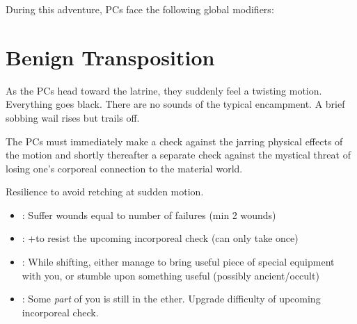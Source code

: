 \documentclass{book}
\newcommand{\spa}{\hskip 0.3em }
\newcommand{\df}{\DifficultyDie }
\newcommand{\stb}{\SetbackDie }
\newcommand{\ch}{\ChallengeDie }
\newcommand{\bbb}{\BoostDie }
\begin{document}
\begin{multicols}{2}
    During this adventure, PCs face the following global modifiers:


\section{Benign Transposition}

As the PCs head toward the latrine, they suddenly feel a twisting motion.  Everything goes black.  There are no sounds of the typical encampment.  A brief sobbing wail rises but trails off.

The PCs must immediately make a check against the jarring physical effects of the motion and shortly thereafter a separate check against the mystical threat of losing one's corporeal connection to the material world.

\ch\df Resilience to avoid retching at sudden motion.
    \begin{itemize}
        \item \Failure: Suffer wounds equal to number of failures (min 2 wounds)
        \item \Advantage: +\bbb to resist the upcoming incorporeal check (can only take once)
        \item \Triumph: While shifting, either manage to bring useful piece of special equipment with you, or stumble upon something useful (possibly ancient/occult)
        \item \Despair: Some \emph{part} of you is still in the ether.  Upgrade difficulty of upcoming incorporeal check.
    \end{itemize}


\end{multicols}
\end{document}

